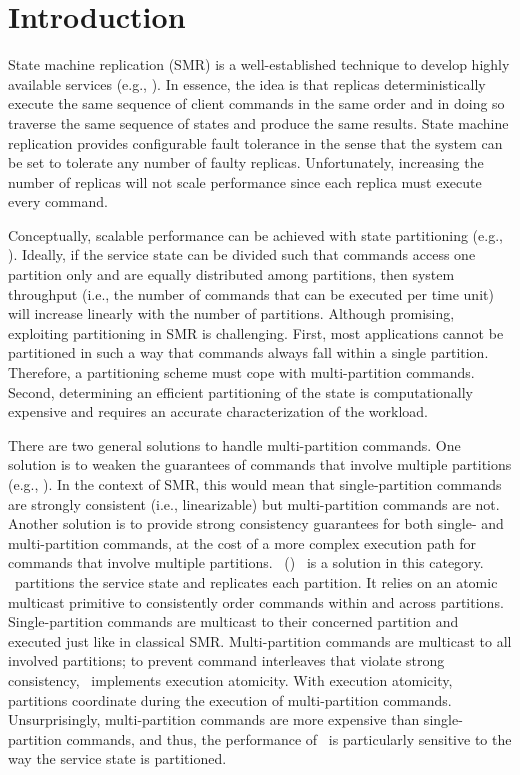 \section{Introduction}

State machine replication (SMR) is a well-established technique to develop highly available services (e.g., \cite{Shvachko:2003,Ghemawat:2003,Burrows:2006,MacCormick:2004}).
In essence, the idea is that replicas deterministically execute the same sequence of client commands in the same order and in doing so traverse the same sequence of states and produce the same results.
State machine replication provides configurable fault tolerance in the sense that the system can be set to tolerate any number of faulty replicas.
Unfortunately, increasing the number of replicas will not scale performance since each replica must execute every command.

Conceptually, scalable performance can be achieved with state partitioning (e.g., \cite{facebookTAO, sciascia2012sdur, Aguilera:2007}).
Ideally, if the service state can be divided such that commands access one partition only and are equally distributed among partitions, then system throughput (i.e., the number of commands that can be executed per time unit) will increase linearly with the number of partitions.
Although promising, exploiting partitioning in SMR is challenging.
First, most applications cannot be partitioned in such a way that commands always fall within a single partition.
Therefore, a partitioning scheme must cope with multi-partition commands.
Second, determining an efficient partitioning of the state is computationally expensive and requires an accurate characterization of the workload.

There are two general solutions to handle multi-partition commands.
One solution is to weaken the guarantees of commands that involve multiple partitions (e.g., \cite{facebookTAO}).
In the context of SMR, this would mean that single-partition commands are strongly consistent (i.e., linearizable) but multi-partition commands are not.
Another solution is to provide strong consistency guarantees for both single- and multi-partition commands, at the cost of a more complex execution path for commands that involve multiple partitions.
\ssmrlong\ (\ssmr)~\cite{bezerra2014ssmr} is a solution in this category.
\ssmr\ partitions the service state and replicates each partition.
It relies on an atomic multicast primitive to consistently order commands within and across partitions.
Single-partition commands are multicast to their concerned partition and executed just like in classical SMR.
Multi-partition commands are multicast to all involved partitions; to prevent command interleaves that violate strong consistency, \ssmr\ implements execution atomicity.
With execution atomicity, partitions coordinate during the execution of multi-partition commands.
Unsurprisingly, multi-partition commands are more expensive than single-partition commands, and thus, the performance of \ssmr\ is particularly sensitive to the way the service state is partitioned.

